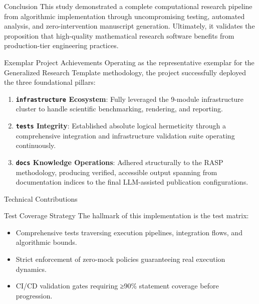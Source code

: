 \documentclass[
  ignorenonframetext,
]{beamer}
\author{\texorpdfstring{}{}}
\date{}
\providecommand{\tightlist}{%
  \setlength{\itemsep}{0pt}\setlength{\parskip}{0pt}}
\begin{document}
\begin{frame}[fragile]{Conclusion}
\protect{}\label{conclusion}
This study demonstrated a complete computational research pipeline from
algorithmic implementation through uncompromising testing, automated
analysis, and zero-intervention manuscript generation. Ultimately, it
validates the proposition that high-quality mathematical research
software benefits from production-tier engineering practices.

\begin{block}{Exemplar Project Achievements}
\protect{}\label{exemplar-project-achievements}
Operating as the representative exemplar for the Generalized Research
Template methodology, the project successfully deployed the three
foundational pillars:

\begin{enumerate}
\tightlist
\item
  \textbf{\texttt{infrastructure} Ecosystem}: Fully leveraged the
  9-module infrastructure cluster to handle scientific benchmarking,
  rendering, and reporting.
\item
  \textbf{\texttt{tests} Integrity}: Established absolute logical
  hermeticity through a comprehensive integration and infrastructure
  validation suite operating continuously.
\item
  \textbf{\texttt{docs} Knowledge Operations}: Adhered structurally to
  the RASP methodology, producing verified, accessible output spanning
  from documentation indices to the final LLM-assisted publication
  configurations.
\end{enumerate}
\end{block}

\begin{block}{Technical Contributions}
\protect{}\label{technical-contributions}
\begin{block}{Test Coverage Strategy}
\protect{}\label{test-coverage-strategy}
The hallmark of this implementation is the test matrix:

\begin{itemize}
\tightlist
\item
  Comprehensive tests traversing execution pipelines, integration flows,
  and algorithmic bounds.
\item
  Strict enforcement of zero-mock policies guaranteeing real execution
  dynamics.
\item
  CI/CD validation gates requiring ≥90\% statement coverage before
  progression.
\end{itemize}
\end{block}


\end{block}
\end{frame}
\end{document}
